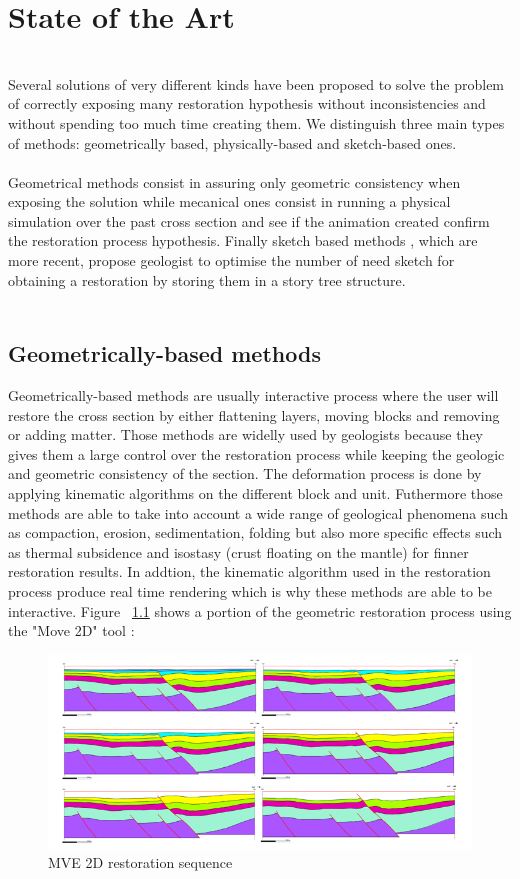 \documentclass[12pt, a4paper]{report} %
\begin{document}
\chapter{State of the Art}\\

Several solutions of very different kinds have been proposed to solve the problem of correctly exposing many restoration hypothesis without inconsistencies and without spending too much time creating them. We distinguish three main types of methods: geometrically based, physically-based and sketch-based ones.\\\\
Geometrical methods consist in assuring only geometric consistency when exposing the solution while mecanical ones consist in running a physical simulation over the past cross section and see if the animation created confirm the restoration process hypothesis. Finally sketch based methods , which are more recent, propose geologist to optimise the number of need sketch for obtaining a restoration by storing them in a story tree structure.\\\\

\section{Geometrically-based methods}

Geometrically-based methods are usually interactive process where the user will restore the cross section by either flattening layers, moving blocks and removing or adding matter.
Those methods are widelly used by geologists because they gives them a large control over the restoration process while keeping the geologic and geometric consistency of the section.  The deformation process is done by applying  kinematic algorithms on the different block and unit. Futhermore those methods are able to take into account a wide range of geological phenomena such as compaction, erosion, sedimentation, folding but also more specific effects such as thermal subsidence and isostasy (crust floating on the mantle) for finner restoration results. In addtion, the kinematic algorithm used in the restoration process produce real time rendering which is why these methods are able to be interactive.
Figure ~\ref{mve} shows a portion of the geometric restoration process using the "Move 2D" tool \citep{Move}:

\begin{figure}[H]
	\centering
	\includegraphics[scale=3]{mve2D.png}
	\caption{MVE 2D restoration sequence}
	\label{mve}
\end{figure}
\end{document}

